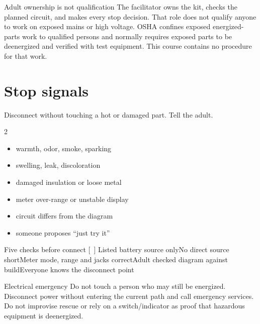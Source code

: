 \begin{telospanel}{Adult ownership is not qualification}
The facilitator owns the kit, checks the planned circuit, and makes every stop
decision. That role does not qualify anyone to work on exposed mains or high
voltage. OSHA confines exposed energized-parts work to qualified persons and
normally requires exposed parts to be deenergized and verified with test
equipment. This course contains no procedure for that work.
\end{telospanel}

\section{Stop signals}
Disconnect without touching a hot or damaged part. Tell the adult.
\begin{multicols}{2}
\begin{itemize}
\item warmth, odor, smoke, sparking
\item swelling, leak, discoloration
\item damaged insulation or loose metal
\item meter over-range or unstable display
\item circuit differs from the diagram
\item someone proposes “just try it”
\end{itemize}
\end{multicols}

\begin{gate}{Five checks before connect}
[\ ] Listed battery source only\quad
[\ ] No direct source short\quad
[\ ] Meter mode, range and jacks correct\quad
[\ ] Adult checked diagram against build\quad
[\ ] Everyone knows the disconnect point
\end{gate}

\begin{teloshazard}{Electrical emergency}
Do not touch a person who may still be energized. Disconnect power without
entering the current path and call emergency services. Do not improvise rescue
or rely on a switch/indicator as proof that hazardous equipment is deenergized.
\end{teloshazard}



